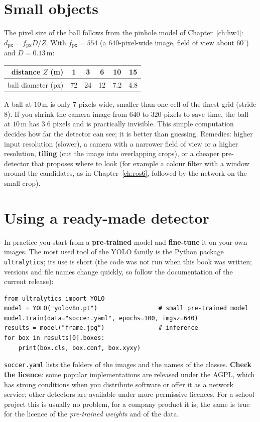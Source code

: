 \section*{Small objects}
The pixel size of the ball follows from the pinhole model of Chapter~\ref{ch:hw4}: $d_\text{px}=f_\text{px}D/Z$. With $f_\text{px}=554$ (a $640$-pixel-wide image, field of view about $60^\circ$) and $D=0.13$\,m:
\begin{center}
\renewcommand{\arraystretch}{1.15}
\begin{tabular}{r|ccccc}
distance $Z$ (m) & 1 & 3 & 6 & 10 & 15\\ \hline
ball diameter (px) & 72 & 24 & 12 & 7.2 & 4.8\\
\end{tabular}
\end{center}
A ball at $10$\,m is only $7$ pixels wide, smaller than one cell of the finest grid (stride $8$). If you shrink the camera image from $640$ to $320$ pixels to save time, the ball at $10$\,m has $3.6$ pixels and is practically invisible. This simple computation decides how far the detector can see; it is better than guessing. Remedies: higher input resolution (slower), a camera with a narrower field of view or a higher resolution, \textbf{tiling} (cut the image into overlapping crops), or a cheaper pre-detector that proposes where to look (for example a colour filter with a window around the candidates, as in Chapter~\ref{ch:ros6}, followed by the network on the small crop).

\section*{Using a ready-made detector}
In practice you start from a \textbf{pre-trained} model and \textbf{fine-tune} it on your own images. The most used tool of the YOLO family is the Python package \texttt{ultralytics}; its use is short (the code was not run when this book was written; versions and file names change quickly, so follow the documentation of the current release):
\begin{verbatim}
from ultralytics import YOLO
model = YOLO("yolov8n.pt")                 # small pre-trained model
model.train(data="soccer.yaml", epochs=100, imgsz=640)
results = model("frame.jpg")               # inference
for box in results[0].boxes:
    print(box.cls, box.conf, box.xyxy)
\end{verbatim}
\texttt{soccer.yaml} lists the folders of the images and the names of the classes. \textbf{Check the licence}: some popular implementations are released under the AGPL, which has strong conditions when you distribute software or offer it as a network service; other detectors are available under more permissive licences. For a school project this is usually no problem, for a company product it is; the same is true for the licence of the \emph{pre-trained weights} and of the data.

